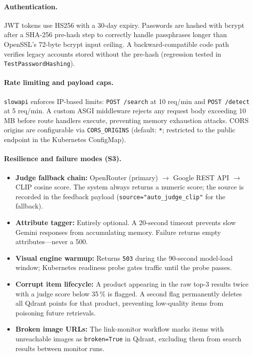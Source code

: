 \documentclass[12pt]{article}
\begin{document}
\paragraph{Authentication.}
JWT tokens use HS256 with a 30-day expiry. Passwords are hashed with bcrypt after a SHA-256 pre-hash step to correctly handle passphrases longer than OpenSSL's 72-byte bcrypt input ceiling. A backward-compatible code path verifies legacy accounts stored without the pre-hash (regression tested in \texttt{TestPasswordHashing}).

\paragraph{Rate limiting and payload caps.}
\texttt{slowapi} enforces IP-based limits: \texttt{POST /search} at 10 req/min and \texttt{POST /detect} at 5 req/min. A custom ASGI middleware rejects any request body exceeding 10\,MB before route handlers execute, preventing memory exhaustion attacks. CORS origins are configurable via \texttt{CORS\_ORIGINS} (default: \texttt{*}; restricted to the public endpoint in the Kubernetes ConfigMap).

\paragraph{Resilience and failure modes (S3).}
\begin{itemize}[leftmargin=*, itemsep=2pt]
    \item \textbf{Judge fallback chain:} OpenRouter (primary) $\to$ Google REST API $\to$ CLIP cosine score. The system always returns a numeric score; the source is recorded in the feedback payload (\texttt{source="auto\_judge\_clip"} for the fallback).
    \item \textbf{Attribute tagger:} Entirely optional. A 20-second timeout prevents slow Gemini responses from accumulating memory. Failure returns empty attributes---never a 500.
    \item \textbf{Visual engine warmup:} Returns \texttt{503} during the 90-second model-load window; Kubernetes readiness probe gates traffic until the probe passes.
    \item \textbf{Corrupt item lifecycle:} A product appearing in the raw top-3 results twice with a judge score below 35\,\% is flagged. A second flag permanently deletes all Qdrant points for that product, preventing low-quality items from poisoning future retrievals.
    \item \textbf{Broken image URLs:} The link-monitor workflow marks items with unreachable images as \texttt{broken=True} in Qdrant, excluding them from search results between monitor runs.
\end{itemize}
\end{document}
